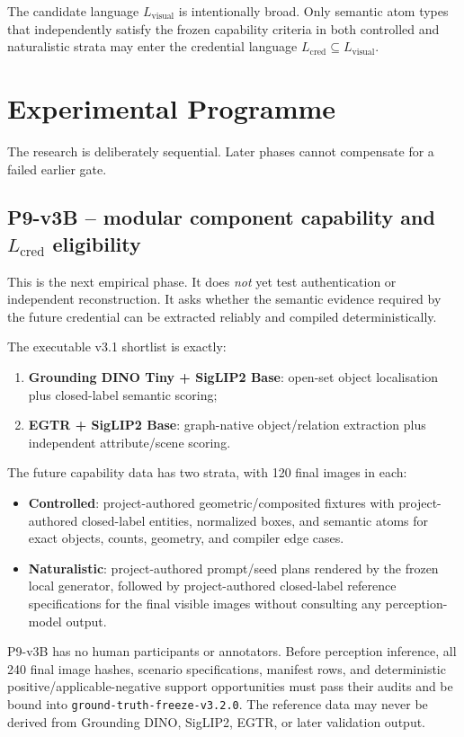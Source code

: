 \documentclass[11pt,a4paper]{article}
\newcommand{\code}[1]{\texttt{#1}}
\begin{document}
The candidate language $L_{\mathrm{visual}}$ is intentionally broad. Only semantic atom types that independently satisfy the frozen capability criteria in both controlled and naturalistic strata may enter the credential language $L_{\mathrm{cred}}\subseteq L_{\mathrm{visual}}$.

\section{Experimental Programme}

The research is deliberately sequential. Later phases cannot compensate for a failed earlier gate.

\subsection{P9-v3B -- modular component capability and $L_{\mathrm{cred}}$ eligibility}

This is the next empirical phase. It does \emph{not} yet test authentication or independent reconstruction. It asks whether the semantic evidence required by the future credential can be extracted reliably and compiled deterministically.

The executable v3.1 shortlist is exactly:
\begin{enumerate}
  \item \textbf{Grounding DINO Tiny + SigLIP2 Base}: open-set object localisation plus closed-label semantic scoring;
  \item \textbf{EGTR + SigLIP2 Base}: graph-native object/relation extraction plus independent attribute/scene scoring.
\end{enumerate}

The future capability data has two strata, with 120 final images in each:
\begin{itemize}
  \item \textbf{Controlled}: project-authored geometric/composited fixtures with project-authored closed-label entities, normalized boxes, and semantic atoms for exact objects, counts, geometry, and compiler edge cases.
  \item \textbf{Naturalistic}: project-authored prompt/seed plans rendered by the frozen local generator, followed by project-authored closed-label reference specifications for the final visible images without consulting any perception-model output.
\end{itemize}

P9-v3B has no human participants or annotators. Before perception inference, all 240 final image hashes, scenario specifications, manifest rows, and deterministic positive/applicable-negative support opportunities must pass their audits and be bound into \code{ground-truth-freeze-v3.2.0}. The reference data may never be derived from Grounding DINO, SigLIP2, EGTR, or later validation output.
\end{document}
